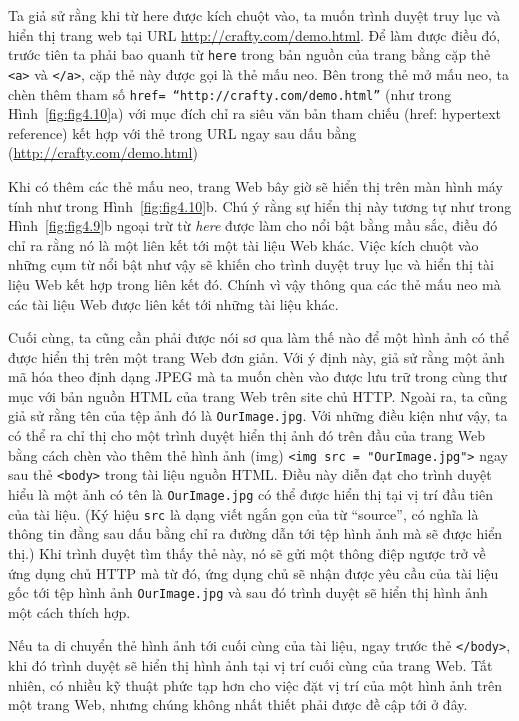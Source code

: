 Ta giả sử rằng khi từ here được kích chuột vào, ta muốn trình duyệt truy lục và hiển thị
trang web tại URL \url{http://crafty.com/demo.html}. Để làm được điều đó, trước tiên ta
phải bao quanh từ \texttt{here} trong bản nguồn của trang bằng cặp thẻ \texttt{<a>} và
\texttt{</a>}, cặp thẻ này được gọi là thẻ mấu neo. Bên trong thẻ mở mấu neo, ta chèn thêm
tham số \texttt{href= “http://crafty.com/demo.html”} (như trong Hình~\ref{fig:fig4.10}a)
với mục đích chỉ ra siêu văn bản tham chiếu (href: hypertext reference) kết hợp với thẻ
trong URL ngay sau dấu bằng (\url{http://crafty.com/demo.html})

Khi có thêm các thẻ mấu neo, trang Web bây giờ sẽ hiển thị trên màn hình máy tính như
trong Hình~\ref{fig:fig4.10}b. Chú ý rằng sự hiển thị này tương tự như trong
Hình~\ref{fig:fig4.9}b ngoại trừ từ \textit{here} được làm cho nổi bật bằng mầu sắc, điều
đó chỉ ra rằng nó là một liên kết tới một tài liệu Web khác. Việc kích chuột vào những cụm
từ nổi bật như vậy sẽ khiến cho trình duyệt truy lục và hiển thị tài liệu Web kết hợp
trong liên kết đó. Chính vì vậy thông qua các thẻ mấu neo mà các tài liệu Web được liên
kết tới những tài liệu khác.

Cuối cùng, ta cũng cần phải được nói sơ qua làm thế nào để một hình ảnh có thể được
hiển thị trên một trang Web đơn giản. Với ý định này, giả sử rằng một ảnh mã hóa theo định
dạng JPEG mà ta muốn chèn vào được lưu trữ trong cùng thư mục với bản nguồn HTML của
trang Web trên site chủ HTTP. Ngoài ra, ta cũng giả sử rằng tên của tệp ảnh đó là
\texttt{OurImage.jpg}. Với những điều kiện như vậy, ta có thể ra chỉ thị cho một
trình duyệt hiển thị ảnh đó trên đầu của trang Web bằng cách chèn vào thêm thẻ hình ảnh
(img) \texttt{<img src = "OurImage.jpg">} ngay sau thẻ \texttt{<body>} trong tài liệu
nguồn HTML. Điều này diễn đạt cho trình duyệt hiểu là một ảnh có tên là
\texttt{OurImage.jpg} có thể được hiển thị tại vị trí đầu tiên của tài liệu. (Ký hiệu
\texttt{src} là dạng viết ngắn gọn của từ ``source'', có nghĩa là thông tin đằng sau dấu
bằng chỉ ra đường dẫn tới tệp hình ảnh mà sẽ được hiển thị.) Khi trình duyệt tìm thấy thẻ
này, nó sẽ gửi một thông điệp ngược trở về ứng dụng chủ HTTP mà từ đó, ứng dụng chủ sẽ
nhận được yêu cầu của tài liệu gốc tới tệp hình ảnh \texttt{OurImage.jpg} và sau đó trình
duyệt sẽ hiển thị hình ảnh một cách thích hợp.

Nếu ta di chuyển thẻ hình ảnh tới cuối cùng của tài liệu, ngay trước thẻ
\texttt{</body>}, khi đó trình duyệt sẽ hiển thị hình ảnh tại vị trí cuối cùng của trang
Web. Tất nhiên, có nhiều kỹ thuật phức tạp hơn cho việc đặt vị trí của một hình ảnh trên
một trang Web, nhưng chúng không nhất thiết phải được đề cập tới ở đây.

